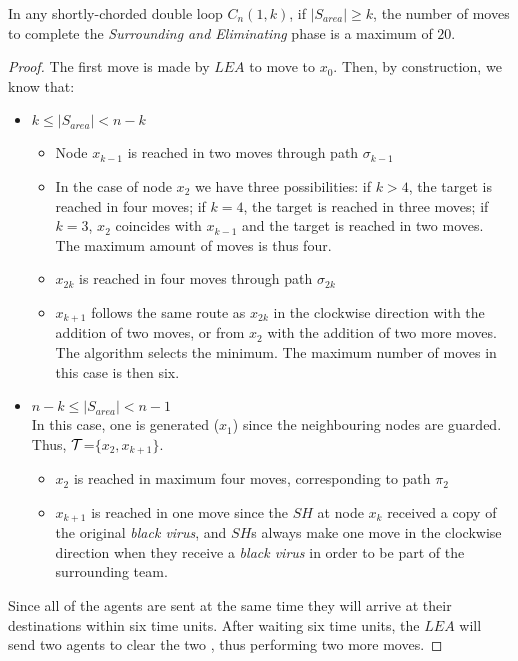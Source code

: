  \begin{theorem}
In any shortly-chorded  double loop   $C_n(1,k)$,  if $\left\vert{S_{area}}\right\vert \ge k$, 
the number of moves to complete the  {\em Surrounding  and Eliminating} phase is a maximum of $20$.
\end{theorem}
 \begin{proof}

 The first move is made by $LEA$ to move to $x_0$. Then, by construction, we know that:
\begin{itemize}
\item $k\leq |S_{area}| <n-k$
\begin{itemize}

\item Node $x_{k-1}$ is reached in two moves through path $\sigma_{k-1}$

\item 
In the case of node $x_{2}$ we have three possibilities:  if $k > 4$,  the target is reached in four moves;  if $k = 4$,  the target is reached in three moves; if $k = 3$, $x_2$ coincides with $x_{k-1}$ and the target is reached in two moves.  The maximum amount of moves is thus four.


\item $x_{2k}$ is reached in four moves through path $\sigma_{2k}$

\item $x_{k+1}$ follows the same route as $x_{2k}$ in the clockwise direction with the addition of two moves,
or from $x_{2}$  with the addition of two more moves. The algorithm selects the minimum. The maximum number of moves in this case is then six.

\end{itemize}

 \item $n-k\leq |S_{area}| <n-1$\\
In this case, one \bv is generated ($x_1$) since the neighbouring nodes are guarded. Thus,
$\cal T$=$\{x_2,x_{k+1}\}$.
\begin{itemize}
\item $x_2$ is reached in maximum four moves, corresponding to path $\pi_2$
\item $x_{k+1}$ is reached in one move since the $SH$ at node $x_{k}$ received a copy of the original {\it black virus}, and $SH$s always make one move in the clockwise direction when they receive a {\it black virus} in order to be part of the surrounding team.
\end{itemize}

\end{itemize}

Since all of the agents are sent at the same time they will arrive at their destinations within six time units.
After waiting six time units, the $LEA$  will send two agents to clear the two \bvs, thus performing two more moves.
\end{proof}

